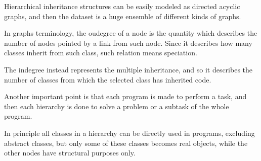 Hierarchical inheritance structures can be easily modeled as directed acyclic graphs, and then the dataset is a huge ensemble of different kinds of graphs.

In graphs terminology, the oudegree of a node is the quantity which describes the number of nodes pointed by a link from such node. Since it describes how many classes inherit from such class, such relation means speciation.

The indegree instead represents the multiple inheritance, and so it describes the number of classes from which the selected class has inherited code.

Another important point is that each program is made to perform a task, and then each hierarchy is done to solve a problem or a subtask of the whole program.

In principle all classes in a hierarchy can be directly used in programs, excluding abstract classes, but only some of these classes becomes real objects, while the other nodes have structural purposes only.

%
%
%
%
%

